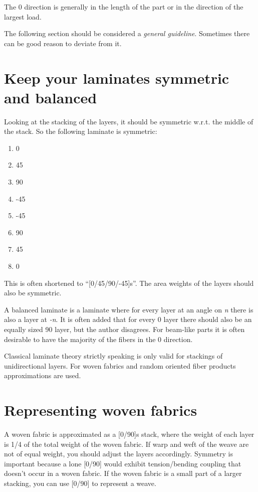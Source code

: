 \documentclass[a4paper,landscape,oneside,11pt,twocolumn]{memoir}
\begin{document}
The 0\textdegree{} direction is generally in the length of the part or in the
direction of the largest load.

The following section should be considered a \emph{general guideline}.
Sometimes there can be good reason to deviate from it.

\section{Keep your laminates symmetric and balanced} %

Looking at the stacking of the layers, it should be symmetric w.r.t. the
middle of the stack. So the following laminate is symmetric:

\begin{enumerate}
    \item 0\textdegree
    \item 45\textdegree
    \item 90\textdegree
    \item -45\textdegree
    \item -45\textdegree
    \item 90\textdegree
    \item 45\textdegree
    \item 0\textdegree
\end{enumerate}

This is often shortened to “[0/45/90/-45]s”. The area weights of the layers
should also be symmetric.

A balanced laminate is a laminate where for every layer at an angle on
\emph{n}\textdegree{} there is also a layer at \emph{-n}\textdegree.
It is often added that for every 0\textdegree{} layer there should also be an
equally sized 90\textdegree{} layer, but the author disagrees. For beam-like
parts it is often desirable to have the majority of the fibers in the
0\textdegree{} direction.

Classical laminate theory strictly speaking is only valid for stackings of
unidirectional layers. For woven fabrics and random oriented fiber products
approximations are used.

\section{Representing woven fabrics}

A woven fabric is approximated as a [0\textdegree/90\textdegree]s stack, where
the weight of each layer is 1/4 of the total weight of the woven fabric. If
warp and weft of the weave are not of equal weight, you should adjust the
layers accordingly. Symmetry is important because a lone
[0\textdegree/90\textdegree] would exhibit tension/bending coupling that
doesn't occur in a woven fabric.
If the woven fabric is a small part of a larger stacking, you can use
[0\textdegree/90\textdegree] to represent a weave.
\end{document}
